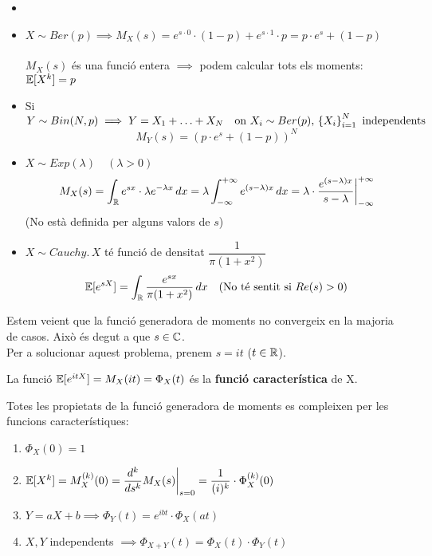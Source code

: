 \begin{example}
  \begin{itemize}
  \item[]
      \item $X \sim Ber(p) \implies M_{X}(s) = e^{s\cdot0}\cdot(1-p) + e^{s\cdot1}\cdot p = p\cdot e^{s} + (1-p)$ \\\\
      $M_{X}(s)$ és una funció entera $\implies$ podem calcular tots els moments: $\mathbb{E}[X^{k}] = p$ \\
      \item Si $Y \sim Bin(N,p) \implies Y=X_{1}+\ldots+X_{N} \quad \text{on } X_{i}\sim Ber(p), 
      \, \left\{X_{i}\right\}_{i=1}^{N} \text{ independents}$
      \[
        M_{Y}(s) = (p\cdot e^{s} + (1-p))^{N}
      \]
      \item $X\sim Exp(\lambda) \quad (\lambda > 0)$
      \[
        M_{X}(s) = \int_{\mathbb{R}}e^{sx}\cdot\lambda e^{-\lambda x} \, dx = \lambda\int_{-\infty}^{+\infty} e^{(s-\lambda)x} \, dx = \lambda\cdot\frac{e^{(s-\lambda)x}}{s-\lambda}\bigg|_{-\infty}^{+\infty}
      \]
      (No està definida per alguns valors de $s$)
      \item $X \sim Cauchy. \, X$ té funció de densitat $\dfrac{1}{\pi(1+x^{2})}$
      \[
        \mathbb{E}[e^{sX}] = \int_{\mathbb{R}}\frac{e^{sx}}{\pi(1+x^{2})}\, dx \quad \text{(No té sentit si $Re(s)>0$)}
      \]
  \end{itemize}
  
\end{example}

\newpage
  
Estem veient que la funció generadora de moments no convergeix en la majoria de casos. Això és degut a que $s\in\mathbb{C}$. \\
Per a solucionar aquest problema, prenem $s=it$ ($t\in\mathbb{R}$).

\begin{defi}
  La funció $\mathbb{E}[e^{itX}] = M_{X}(it) = \Phi_{X}(t)$ és la \textbf{funció característica} de X.
\end{defi}

\begin{obs}
  Totes les propietats de la funció generadora de moments es compleixen per les funcions característiques:
  \begin{enumerate}
      \item  $\Phi_{X}(0) = 1$
      \item $\mathbb{E}[X^{k}] = M_{X}^{(k)}(0) = \dfrac{d^{k}}{ds^{k}}M_{X}(s)\bigg|_{s=0} = \dfrac{1}{(i)^{k}}\cdot \Phi_{X}^{(k)}(0)$
      \item $Y = aX+b \implies \Phi_{Y}(t) = e^{ibt}\cdot \Phi_{X}(at)$
      \item $X,Y$ independents $\implies \Phi_{X+Y}(t)=\Phi_{X}(t)\cdot\Phi_{Y}(t)$
  \end{enumerate}
\end{obs}

